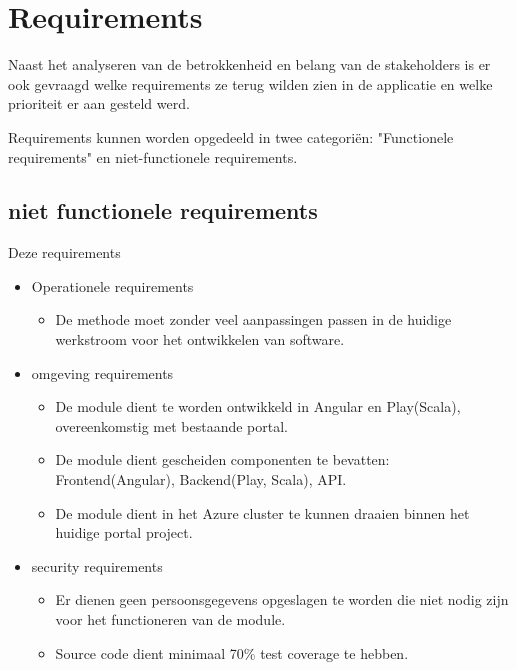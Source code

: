 \section{Requirements}\label{sec:requirements}
Naast het analyseren van de betrokkenheid en belang van de stakeholders is er ook gevraagd welke requirements ze terug wilden zien in de applicatie en welke prioriteit er aan gesteld werd.

Requirements kunnen worden opgedeeld in twee categoriën: "Functionele requirements" en niet-functionele requirements.

\subsection{niet functionele requirements}\label{subsec:niet-functionele-requirements}
Deze requirements
\begin{itemize}
    \item Operationele requirements
        \begin{itemize}
            \item De methode moet zonder veel aanpassingen passen in de huidige werkstroom voor het ontwikkelen van software.
        \end{itemize}
    \item omgeving requirements
        \begin{itemize}
            \item De module dient te worden ontwikkeld in Angular en Play(Scala), overeenkomstig met bestaande portal.
            \item De module dient gescheiden componenten te bevatten: Frontend(Angular), Backend(Play, Scala), API.
            \item De module dient in het Azure cluster te kunnen draaien binnen het huidige portal project.
        \end{itemize}
    \item security requirements
        \begin{itemize}
            \item Er dienen geen persoonsgegevens opgeslagen te worden die niet nodig zijn voor het functioneren van de module.
            \item Source code dient minimaal 70\% test coverage te hebben.
        \end{itemize}
\end{itemize}

